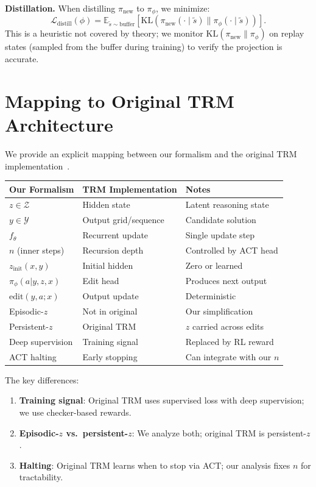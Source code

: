 \documentclass{article}
\theoremstyle{plain}
\theoremstyle{definition}
\theoremstyle{remark}
\newcommand{\E}{\mathbb{E}}
\newcommand{\YY}{\mathcal{Y}}
\newcommand{\ZZ}{\mathcal{Z}}
\newcommand{\KL}{\mathrm{KL}}
\begin{document}
\textbf{Distillation.}
When distilling $\pi_{\mathrm{new}}$ to $\pi_\phi$, we minimize:
\[
\mathcal{L}_{\mathrm{distill}}(\phi) = \E_{\tilde{s}\sim\text{buffer}}[\KL(\pi_{\mathrm{new}}(\cdot\mid\tilde{s}) \| \pi_\phi(\cdot\mid\tilde{s}))].
\]
This is a heuristic not covered by theory; we monitor $\KL(\pi_{\mathrm{new}} \| \pi_\phi)$ on replay states (sampled from the buffer during training) to verify the projection is accurate.

\section{Mapping to Original TRM Architecture}
\label{app:trm_mapping}

We provide an explicit mapping between our formalism and the original TRM implementation~\citep{TRM2025}.

\begin{center}
\begin{tabular}{lll}
\toprule
Our Formalism & TRM Implementation & Notes \\
\midrule
$z \in \ZZ$ & Hidden state & Latent reasoning state \\
$y \in \YY$ & Output grid/sequence & Candidate solution \\
$f_\theta$ & Recurrent update & Single update step \\
$n$ (inner steps) & Recursion depth & Controlled by ACT head \\
$z_{\mathrm{init}}(x,y)$ & Initial hidden & Zero or learned \\
$\pi_\phi(a|y,z,x)$ & Edit head & Produces next output \\
$\mathrm{edit}(y,a;x)$ & Output update & Deterministic \\
\midrule
Episodic-$z$ & Not in original & Our simplification \\
Persistent-$z$ & Original TRM & $z$ carried across edits \\
Deep supervision & Training signal & Replaced by RL reward \\
ACT halting & Early stopping & Can integrate with our $n$ \\
\bottomrule
\end{tabular}
\end{center}

The key differences:
\begin{enumerate}
\item \textbf{Training signal}: Original TRM uses supervised loss with deep supervision; we use checker-based rewards.
\item \textbf{Episodic-$z$ vs.\ persistent-$z$}: We analyze both; original TRM is persistent-$z$.
\item \textbf{Halting}: Original TRM learns when to stop via ACT; our analysis fixes $n$ for tractability.
\end{enumerate}
\end{document}

